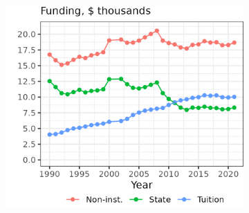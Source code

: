 \begin{figure}[!htbp]
\begin{subfigure}[b]{0.495\textwidth}
        \includegraphics[width=\textwidth]{figures/mean-funding-fte.png}
        \label{fig:mean-funding-fte}
    \end{subfigure}
    \label{fig:funding}
\end{figure}


